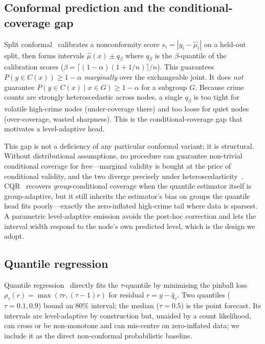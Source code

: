 \documentclass[11pt,conference]{IEEEtran}
\begin{document}
\subsection{Conformal prediction and the conditional-coverage gap}\label{sec:cp}
Split conformal~\cite{lei2018distribution} calibrates a nonconformity score
$s_i=|y_i-\hat\mu_i|$ on a held-out split, then forms intervals
$\hat\mu(x)\pm q_{\beta}$ where $q_{\beta}$ is the $\beta$-quantile of the
calibration scores ($\beta=\lceil(1-\alpha)(1+1/n)\rceil/n$). This guarantees
$P(y\in C(x))\ge 1-\alpha$ \emph{marginally} over the exchangeable joint. It does
\emph{not} guarantee $P(y\in C(x)\mid x\in G)\ge 1-\alpha$ for a subgroup $G$.
Because crime counts are strongly heteroscedastic across nodes, a single $q_\beta$
is too tight for volatile high-crime nodes (under-coverage there) and too loose
for quiet nodes (over-coverage, wasted sharpness). This is the
conditional-coverage gap that motivates a level-adaptive head.

This gap is not a deficiency of any particular conformal variant; it is
structural. Without distributional assumptions, no procedure can guarantee
non-trivial conditional coverage for free---marginal validity is bought at the
price of conditional validity, and the two diverge precisely under
heteroscedasticity~\cite{vovk2005random,romano2019cqr,angelopoulos2022gentle}.
CQR~\cite{romano2019cqr} recovers \emph{group}-conditional coverage when the
quantile estimator itself is group-adaptive, but it still inherits the
estimator's bias on groups the quantile head fits poorly---exactly the
zero-inflated high-crime tail where data is sparsest. A parametric
level-adaptive emission avoids the post-hoc correction and lets the interval
width respond to the node's own predicted level, which is the design we adopt.

\subsection{Quantile regression}\label{sec:qr}
Quantile regression~\cite{koenker1978regression} directly fits the $\tau$-quantile
by minimising the pinball loss
$\rho_\tau(r)=\max(\tau r,(\tau{-}1)r)$ for residual $r=y-\hat q_\tau$. Two
quantiles ($\tau=0.1,0.9$) bound an 80\% interval; the median ($\tau=0.5$) is the
point forecast. Its intervals are level-adaptive by construction but, unaided by
a count likelihood, can cross or be non-monotone and can mis-centre on
zero-inflated data; we include it as the direct non-conformal probabilistic
baseline.
\end{document}
